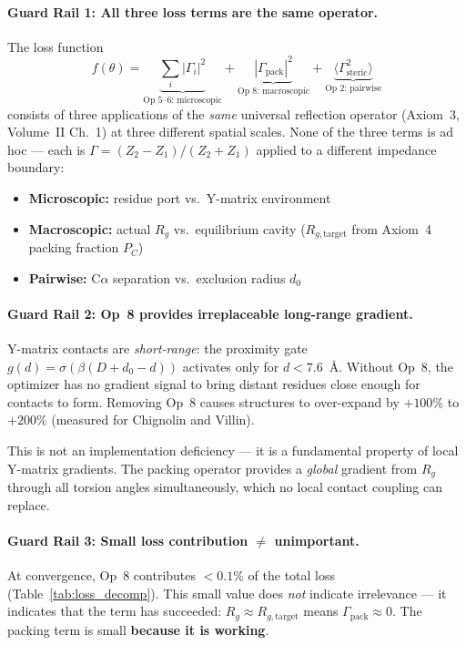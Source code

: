 \paragraph{Guard Rail 1: All three loss terms are the same operator.}
The loss function
\begin{equation}
    f(\theta) = \underbrace{\sum_i |\Gamma_i|^2}_{\text{Op 5--6: microscopic}}
    + \underbrace{|\Gamma_\text{pack}|^2}_{\text{Op 8: macroscopic}}
    + \underbrace{\langle\Gamma_\text{steric}^2\rangle}_{\text{Op 2: pairwise}}
    \label{eq:three_scale_loss}
\end{equation}
consists of three applications of the \emph{same} universal reflection
operator (Axiom~3, Volume~II Ch.~1) at three different spatial scales.
None of the three terms is ad hoc --- each is
$\Gamma = (Z_2 - Z_1)/(Z_2 + Z_1)$ applied to a different impedance
boundary:
\begin{itemize}
    \item \textbf{Microscopic:} residue port vs.\ Y-matrix environment
    \item \textbf{Macroscopic:} actual $R_g$ vs.\ equilibrium cavity
          ($R_{g,\text{target}}$ from Axiom~4 packing fraction $P_C$)
    \item \textbf{Pairwise:} C$\alpha$ separation vs.\ exclusion
          radius $d_0$
\end{itemize}

\paragraph{Guard Rail 2: Op~8 provides irreplaceable long-range gradient.}
Y-matrix contacts are \emph{short-range}: the proximity gate
$g(d) = \sigma(\beta(D + d_0 - d))$ activates only for $d < 7.6$~\AA.
Without Op~8, the optimizer has no gradient signal to bring distant
residues close enough for contacts to form.  Removing Op~8 causes
structures to over-expand by $+100\%$ to $+200\%$ (measured for
Chignolin and Villin).

This is not an implementation deficiency --- it is a fundamental
property of local Y-matrix gradients.  The packing operator provides
a \emph{global} gradient from $R_g$ through all torsion angles
simultaneously, which no local contact coupling can replace.

\paragraph{Guard Rail 3: Small loss contribution $\neq$ unimportant.}
At convergence, Op~8 contributes $<0.1\%$ of the total loss
(Table~\ref{tab:loss_decomp}).  This small value does \emph{not}
indicate irrelevance --- it indicates that the term has succeeded:
$R_g \approx R_{g,\text{target}}$ means $\Gamma_\text{pack} \approx 0$.
The packing term is small \textbf{because it is working}.



